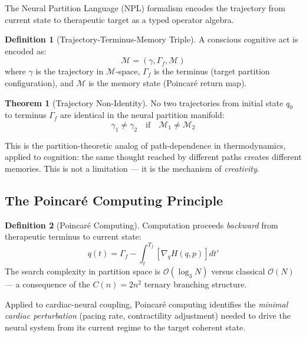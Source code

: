 \documentclass[10pt,twocolumn,a4paper]{article}
\theoremstyle{definition}
\newtheorem{theorem}{Theorem}
\newtheorem{definition}{Definition}
\newcommand{\calM}{\mathcal{M}}
\begin{document}
The Neural Partition Language (NPL) formalism encodes the trajectory from
current state to therapeutic target as a typed operator algebra.

\begin{definition}[Trajectory-Terminus-Memory Triple]
A conscious cognitive act is encoded as:
\begin{equation}
\mathcal{M} = (\gamma, \Gamma_f, \mathcal{M})
\end{equation}
where $\gamma$ is the trajectory in $\calM$-space, $\Gamma_f$ is the
terminus (target partition configuration), and $\mathcal{M}$ is the memory
state (Poincaré return map).
\end{definition}

\begin{theorem}[Trajectory Non-Identity]
No two trajectories from initial state $q_0$ to terminus $\Gamma_f$ are
identical in the neural partition manifold:
\begin{equation}
\gamma_1 \neq \gamma_2 \quad \text{if} \quad \mathcal{M}_1 \neq \mathcal{M}_2
\end{equation}
\end{theorem}

This is the partition-theoretic analog of path-dependence in thermodynamics,
applied to cognition: the same thought reached by different paths creates
different memories. This is not a limitation — it is the mechanism of
\emph{creativity}.

\subsection{The Poincaré Computing Principle}

\begin{definition}[Poincaré Computing]
Computation proceeds \emph{backward} from therapeutic terminus to current state:
\begin{equation}
q(t) = \Gamma_f - \int_t^{T_f} \left[\nabla_q H(q,p)\right] dt'
\end{equation}
The search complexity in partition space is $\mathcal{O}(\log_3 N)$
versus classical $\mathcal{O}(N)$ — a consequence of the $C(n) = 2n^2$
ternary branching structure.
\end{definition}

Applied to cardiac-neural coupling, Poincaré computing identifies the
\emph{minimal cardiac perturbation} (pacing rate, contractility adjustment)
needed to drive the neural system from its current regime to the target
coherent state.
\end{document}

